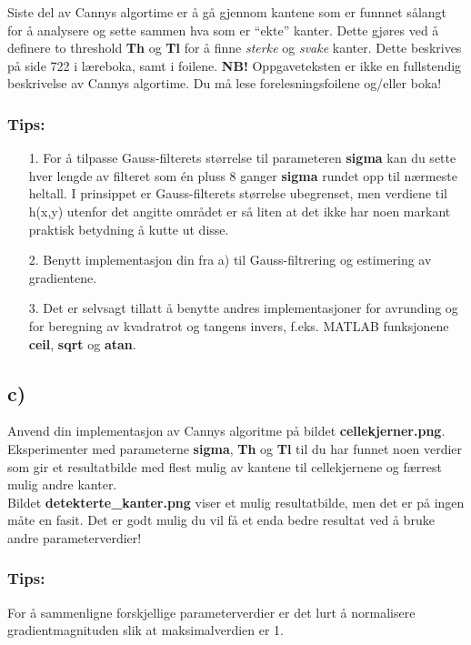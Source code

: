 \documentclass[11pt,a4paper]{article}
\begin{document}
Siste del av Cannys algortime er å gå gjennom kantene som er funnnet sålangt for å analysere
og sette sammen hva som er ``ekte'' kanter. Dette gjøres ved å definere to threshold \textbf{Th} og \textbf{Tl} 
for å finne \textit{sterke} og \textit{svake} kanter. Dette beskrives på side 722 i læreboka, 
samt i foilene.
\textbf{NB!} Oppgaveteksten er ikke en fullstendig beskrivelse av Cannys algortime. Du må lese 
forelesningsfoilene og/eller boka!

\subsubsection*{Tips:}
\begin{itemize}
\item[1.] For å tilpasse Gauss-filterets størrelse til parameteren \textbf{sigma} kan du sette
hver lengde av filteret som én pluss 8 ganger \textbf{sigma} rundet opp til
nærmeste heltall. I prinsippet er Gauss-filterets størrelse ubegrenset, men
verdiene til h(x,y) utenfor det angitte området er så liten at det ikke har
noen markant praktisk betydning å kutte ut disse.
\item[2.] Benytt implementasjon din fra a) til Gauss-filtrering og estimering av
gradientene.
\item[3.] Det er selvsagt tillatt å benytte andres implementasjoner for avrunding
og for beregning av kvadratrot og tangens invers, f.eks. MATLAB funksjonene
\textbf{ceil}, \textbf{sqrt} og \textbf{atan}.
\end{itemize}

\subsection*{c)}
Anvend din implementasjon av Cannys algoritme på bildet \textbf{cellekjerner.png}.
Eksperimenter med parameterne \textbf{sigma}, \textbf{Th} og \textbf{Tl} til du har funnet noen
verdier som gir et resultatbilde med flest mulig av kantene til cellekjernene og
færrest mulig andre kanter.
\\

Bildet \textbf{detekterte\_kanter.png} viser et mulig resultatbilde, 
men det er på ingen måte en fasit. Det er godt mulig du vil få et enda bedre resultat ved å bruke
andre parameterverdier!


\subsubsection*{Tips:} For å sammenligne forskjellige parameterverdier er det lurt å
normalisere gradientmagnituden slik at maksimalverdien er 1.
\\
\end{document}
